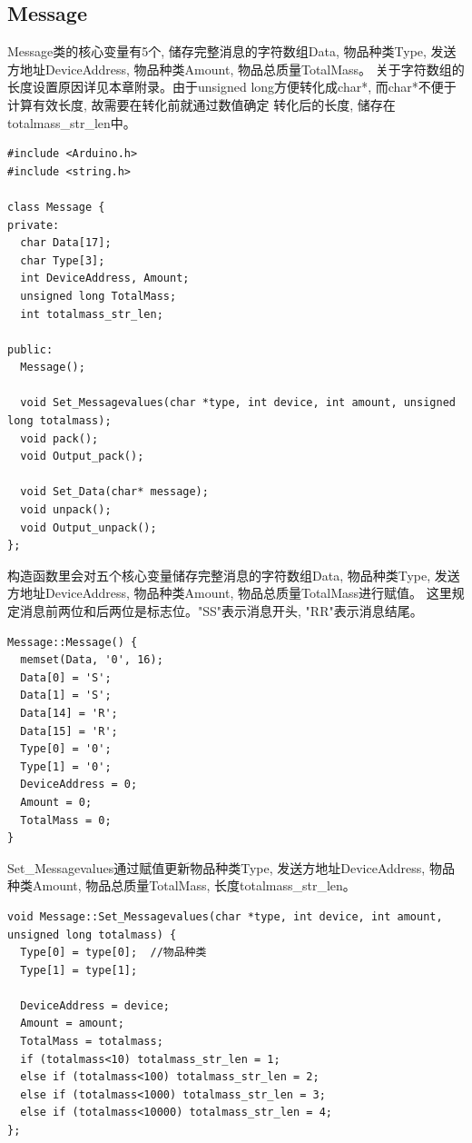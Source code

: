 \documentclass{article}
\begin{document}
\subsection{Message}
Message类的核心变量有5个, 储存完整消息的字符数组Data, 物品种类Type, 发送方地址DeviceAddress, 物品种类Amount, 物品总质量TotalMass。
关于字符数组的长度设置原因详见本章附录。由于unsigned long方便转化成char*, 而char*不便于计算有效长度, 故需要在转化前就通过数值确定
转化后的长度, 储存在totalmass\_str\_len中。
\begin{lstlisting}
#include <Arduino.h>
#include <string.h>

class Message {
private:
  char Data[17];
  char Type[3];
  int DeviceAddress, Amount;
  unsigned long TotalMass;
  int totalmass_str_len;

public:
  Message();
  
  void Set_Messagevalues(char *type, int device, int amount, unsigned long totalmass);
  void pack();
  void Output_pack();

  void Set_Data(char* message);
  void unpack();
  void Output_unpack();
};
\end{lstlisting}

构造函数里会对五个核心变量储存完整消息的字符数组Data, 物品种类Type, 发送方地址DeviceAddress, 物品种类Amount, 物品总质量TotalMass进行赋值。
这里规定消息前两位和后两位是标志位。"SS"表示消息开头, "RR"表示消息结尾。
\begin{lstlisting}
Message::Message() {
  memset(Data, '0', 16);
  Data[0] = 'S';
  Data[1] = 'S';
  Data[14] = 'R';
  Data[15] = 'R';
  Type[0] = '0';
  Type[1] = '0';
  DeviceAddress = 0;
  Amount = 0;
  TotalMass = 0;
}
\end{lstlisting}

Set\_Messagevalues通过赋值更新物品种类Type, 发送方地址DeviceAddress, 物品种类Amount, 物品总质量TotalMass, 长度totalmass\_str\_len。
\begin{lstlisting}
void Message::Set_Messagevalues(char *type, int device, int amount, unsigned long totalmass) {
  Type[0] = type[0];  //物品种类
  Type[1] = type[1];

  DeviceAddress = device;
  Amount = amount;
  TotalMass = totalmass;
  if (totalmass<10) totalmass_str_len = 1;
  else if (totalmass<100) totalmass_str_len = 2;
  else if (totalmass<1000) totalmass_str_len = 3;
  else if (totalmass<10000) totalmass_str_len = 4;
};
\end{lstlisting}
\end{document}
